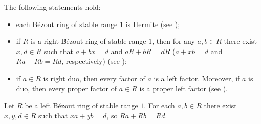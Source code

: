 \documentclass{cimart}
\begin{document}
\begin{lemma} \label{LLL:2}
The following statements hold:
\begin{itemize}

\item[(i)] each B\'ezout ring of stable range $1$ is Hermite  (see \cite[Theorem 2]{4-zabavsky});

\item[(ii)] if  $R$ is  a right B\'ezout ring of stable range $1$, then for any $a,b\in R$ there exist $x,d\in R$ such that $a+bx=d$ and $aR+bR=dR$ ($a+xb=d$ and $Ra+Rb=Rd$, respectively) (see \cite[Proposition 6]{5-zabavsky});

\item[(iii)] if $a\in R$ is right duo,  then every factor of $a$ is a left factor. Moreover,  if $a$ is duo,  then every proper factor of $a\in R$ is a proper left factor (see \cite[Proposition 2]{6-beauregard}).
\end{itemize}
\end{lemma}

\begin{remark}\label{rem-1}
Let $R$ be a left B\'ezout ring  of stable range $1$. For each  $a,b\in R$ there  exist $x,y, d\in R$ such that $xa+yb=d$, so $Ra+Rb=Rd$.
\end{remark}
\end{document}
